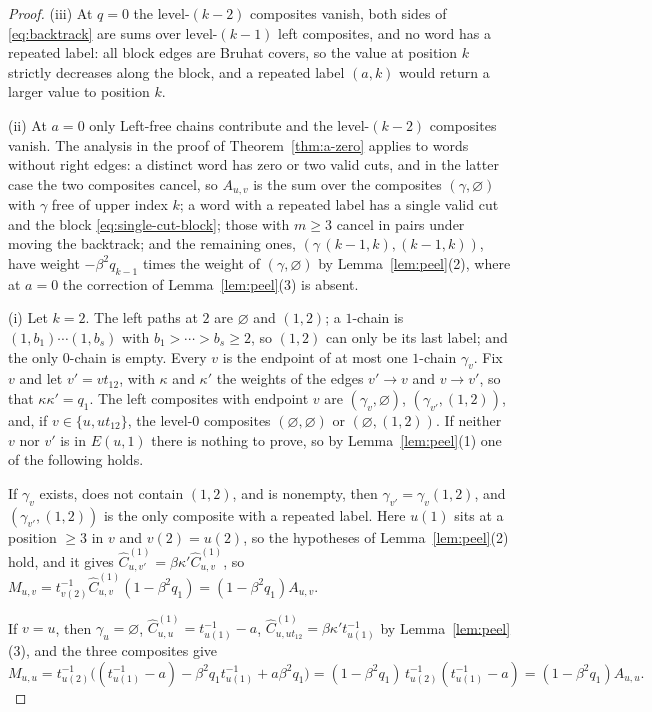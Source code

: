 \documentclass[11pt]{article}
\begin{document}
\begin{proof}
(iii) At $q=0$ the level-$(k-2)$ composites vanish, both sides of
\eqref{eq:backtrack} are sums over level-$(k-1)$ left composites, and
no word has a repeated label: all block edges are Bruhat covers, so the
value at position $k$ strictly decreases along the block, and a
repeated label $(a,k)$ would return a larger value to position $k$.

(ii) At $a=0$ only Left-free chains contribute and the level-$(k-2)$
composites vanish. The analysis in the proof of
Theorem~\ref{thm:a-zero} applies to words without right edges: a
distinct word has zero or two valid cuts, and in the latter case the
two composites cancel, so $A_{u,v}$ is the sum over the composites
$(\gamma,\varnothing)$ with $\gamma$ free of upper index $k$; a word
with a repeated label has a single valid cut and the block
\eqref{eq:single-cut-block}; those with $m\geq3$ cancel in pairs under
moving the backtrack; and the remaining ones,
$(\gamma\,(k-1,k),(k-1,k))$, have weight $-\beta^2q_{k-1}$ times the
weight of $(\gamma,\varnothing)$ by Lemma~\ref{lem:peel}(2), where at
$a=0$ the correction of Lemma~\ref{lem:peel}(3) is absent.

(i) Let $k=2$. The left paths at $2$ are $\varnothing$ and $(1,2)$;
a $1$-chain is $(1,b_1)\cdots(1,b_s)$ with $b_1>\cdots>b_s\geq2$, so
$(1,2)$ can only be its last label; and the only $0$-chain is empty.
Every $v$ is the endpoint of at most one $1$-chain $\gamma_v$. Fix $v$
and let $v'=vt_{12}$, with $\kappa$ and $\kappa'$ the weights of the
edges $v'\to v$ and $v\to v'$, so that $\kappa\kappa'=q_1$. The left
composites with endpoint $v$ are $(\gamma_v,\varnothing)$,
$(\gamma_{v'},(1,2))$, and, if $v\in\{u,ut_{12}\}$, the level-$0$
composites $(\varnothing,\varnothing)$ or $(\varnothing,(1,2))$. If
neither $v$ nor $v'$ is in $E(u,1)$ there is nothing to prove, so by
Lemma~\ref{lem:peel}(1) one of the following holds.

If $\gamma_v$ exists, does not contain $(1,2)$, and is nonempty, then
$\gamma_{v'}=\gamma_v(1,2)$, and $(\gamma_{v'},(1,2))$ is the only
composite with a repeated label. Here $u(1)$ sits at a position
$\geq3$ in $v$ and $v(2)=u(2)$, so the hypotheses of
Lemma~\ref{lem:peel}(2) hold, and it gives
$\widehat C^{(1)}_{u,v'}=\beta\kappa'\widehat C^{(1)}_{u,v}$, so
$M_{u,v}=t^{-1}_{v(2)}\widehat C^{(1)}_{u,v}(1-\beta^2q_1)
 =(1-\beta^2q_1)A_{u,v}$.

If $v=u$, then $\gamma_u=\varnothing$,
$\widehat C^{(1)}_{u,u}=t^{-1}_{u(1)}-a$,
$\widehat C^{(1)}_{u,ut_{12}}=\beta\kappa' t^{-1}_{u(1)}$ by
Lemma~\ref{lem:peel}(3), and the three composites give
\[
 M_{u,u}=t^{-1}_{u(2)}\bigl((t^{-1}_{u(1)}-a)
   -\beta^2q_1t^{-1}_{u(1)}+a\beta^2q_1\bigr)
 =(1-\beta^2q_1)\,t^{-1}_{u(2)}(t^{-1}_{u(1)}-a)
 =(1-\beta^2q_1)A_{u,u}.
\]


\end{proof}
\end{document}
